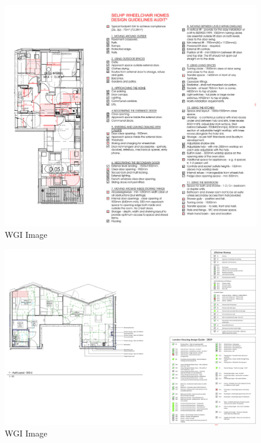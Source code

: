 \documentclass[
]{article}
\begin{document}
\begin{figure}[H]

{\centering \includegraphics{assets/WGI/WGI-Audit1.jpg}

}

\caption{WGI Image}

\end{figure}%
\begin{figure}[H]

{\centering \includegraphics{assets/WGI/WGI-Audit2.jpg}

}

\caption{WGI Image}

\end{figure}%
\end{document}
